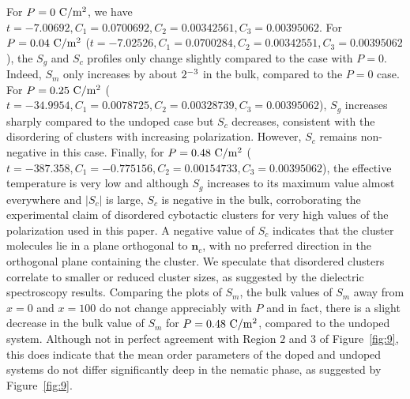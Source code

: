 \documentclass[reprint,amsfonts,amsmath,amssymb,aps,pre,floatfix,10pt]{revtex4-1}
\newcommand\n{\mathbf{n}}
\begin{document}
For $P = 0 ~\rm{C} / \rm{m}^2$, we have $t =-7.00692, C_1 =0.0700692, C_2 =0.00342561, C_3 =0.00395062$.
For $P = 0.04 ~ \rm{C} / \rm{m}^2$ ($t =-7.02526, C_1 =0.0700284, C_2 =0.00342551, C_3 =0.00395062$), the $S_g$ and $S_c$ profiles only change slightly compared to the case with $P = 0$. Indeed, $S_m$ only increases by about $2 \time 10^{-3}$ in the bulk, compared to the $P=0$ case. For $P = 0.25 ~ \rm{C} / \rm{m}^2$ ($t =-34.9954, C_1 =0.0078725, C_2 =0.00328739, C_3 =0.00395062$), $S_g$ increases sharply compared to the undoped case but $S_c$ decreases, consistent with the disordering of clusters with increasing polarization. However, $S_c$ remains non-negative in this case.  Finally, for $P = 0.48 ~ \rm{C}/\rm{m}^2$ ($t =-387.358, C_1 =-0.775156, C_2 =0.00154733, C_3 =0.00395062$), the effective temperature is very low and although $S_g$ increases to its maximum value almost everywhere  and $|S_c|$ is large, $S_c$ is negative in the bulk, corroborating the experimental claim of disordered cybotactic clusters for very high values of the polarization used in this paper. A negative value of $S_c$ indicates that the cluster molecules lie in a plane orthogonal to $\n_c$, with no preferred direction in the orthogonal plane containing the cluster. We speculate that disordered clusters correlate to smaller or reduced cluster sizes, as suggested by the dielectric spectroscopy results. Comparing the plots of $S_m$, the bulk values of $S_m$  away from $x=0$ and $x=100$ do not change appreciably with $P$ and in fact, there is a slight decrease in the bulk value of $S_m$ for $P= 0.48 ~ \rm{C}/\rm{m}^2$, compared to the undoped system. Although not in perfect agreement with Region $2$ and $3$ of Figure~\ref{fig:9}, this does indicate that the mean order parameters of the doped and undoped systems do not differ significantly deep in the nematic phase, as suggested by Figure~\ref{fig:9}.
\end{document}
